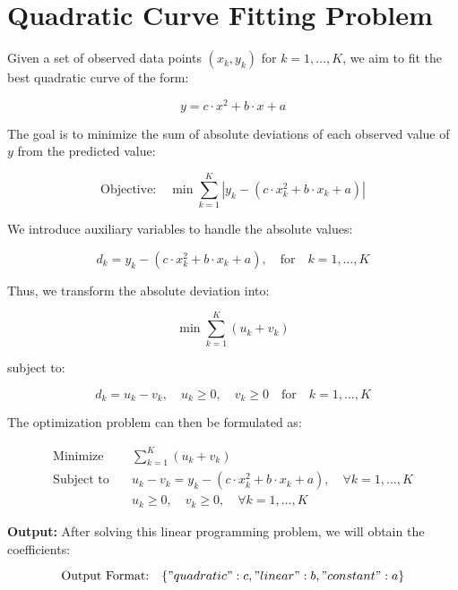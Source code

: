\documentclass{article}
\begin{document}
\section*{Quadratic Curve Fitting Problem}

Given a set of observed data points \( (x_k, y_k) \) for \( k = 1, \ldots, K \), we aim to fit the best quadratic curve of the form:

\[
y = c \cdot x^2 + b \cdot x + a
\]

The goal is to minimize the sum of absolute deviations of each observed value of \( y \) from the predicted value:

\[
\text{Objective:} \quad \min \sum_{k=1}^{K} |y_k - (c \cdot x_k^2 + b \cdot x_k + a)|
\]

We introduce auxiliary variables to handle the absolute values:

\[
d_k = y_k - (c \cdot x_k^2 + b \cdot x_k + a), \quad \text{for} \quad k = 1, \ldots, K
\]

Thus, we transform the absolute deviation into:

\[
\min \sum_{k=1}^{K} (u_k + v_k)
\]

subject to:

\[
d_k = u_k - v_k, \quad u_k \geq 0, \quad v_k \geq 0 \quad \text{for} \quad k = 1, \ldots, K
\]

The optimization problem can then be formulated as:

\[
\begin{aligned}
\text{Minimize} \quad & \sum_{k=1}^{K} (u_k + v_k) \\
\text{Subject to} \quad & u_k - v_k = y_k - (c \cdot x_k^2 + b \cdot x_k + a), \quad \forall k = 1, \ldots, K \\
& u_k \geq 0, \quad v_k \geq 0, \quad \forall k = 1, \ldots, K
\end{aligned}
\]

\textbf{Output:}
After solving this linear programming problem, we will obtain the coefficients:

\[
\text{Output Format:} \quad \{ "quadratic": c, "linear": b, "constant": a \}
\]
\end{document}
